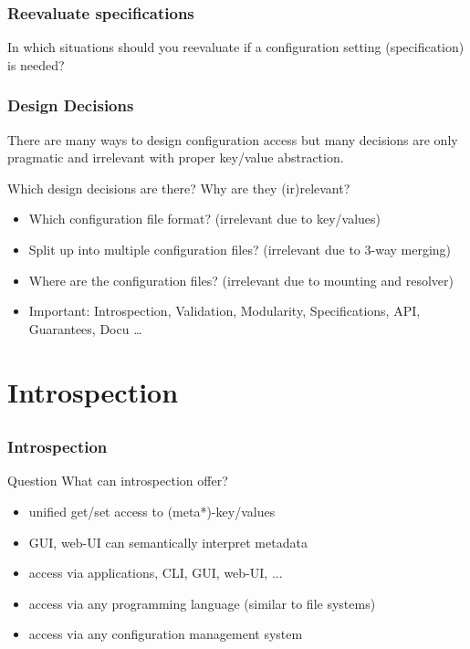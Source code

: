 \begin{frame}
	\frametitle{Reevaluate specifications}

	In which situations should you reevaluate if a configuration setting (specification) is needed?

\end{frame}

\begin{frame}
	\frametitle{Design Decisions}

	There are many ways to design configuration access but many decisions are only pragmatic and irrelevant with proper key/value abstraction.

	\begin{task}
	Which design decisions are there?
	Why are they (ir)relevant?
	\end{task}

	\pause

	\begin{itemize}
	\item Which configuration file format? (irrelevant due to key/values)
	\item Split up into multiple configuration files? (irrelevant due to 3-way merging)
	\item Where are the configuration files? (irrelevant due to mounting and resolver)
	\item Important: Introspection, Validation, Modularity, Specifications, API, Guarantees, Docu \dots
	\end{itemize}
\end{frame}






\section{Introspection}

\subsection{}

\begin{frame}
	\frametitle{Introspection}
	\begin{alertblock}{Question}
	What can introspection offer?
	\end{alertblock}

	\pause
	\begin{itemize}
	\item unified get/set access to (meta*)-key/values
	\item GUI, web-UI can semantically interpret metadata
	\item access via applications, CLI, GUI, web-UI, ...
	\item access via any programming language (similar to file systems)
	\item access via any configuration management system
	\end{itemize}
\end{frame}

